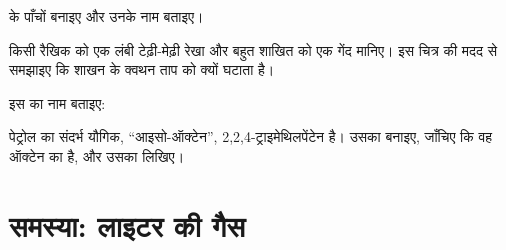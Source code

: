 \begin{exercise}[$\star\star\star$]\label{exo:g11:organic-skeletons:12}
 के पाँचों  बनाइए और उनके नाम बताइए।
\end{exercise}

\begin{exercise}[$\star\star\star$]\label{exo:g11:organic-skeletons:13}
किसी रैखिक  को एक लंबी टेढ़ी-मेढ़ी रेखा और बहुत शाखित  को एक गेंद
मानिए। इस चित्र की मदद से समझाइए कि शाखन  के क्वथन
ताप को क्यों घटाता है।
\end{exercise}

\begin{exercise}[$\star\star\star$]\label{exo:g11:organic-skeletons:14}
इस  का नाम बताइए:
\begin{center}
\end{center}
\end{exercise}

\begin{exercise}[$\star\star\star$]\label{exo:g11:organic-skeletons:15}
पेट्रोल का संदर्भ यौगिक, ``आइसो-ऑक्टेन'',
2,2,4-ट्राइमेथिलपेंटेन है। उसका  बनाइए, जाँचिए कि वह ऑक्टेन का
 है, और उसका  लिखिए।
\end{exercise}

\section{समस्या: लाइटर की गैस}

